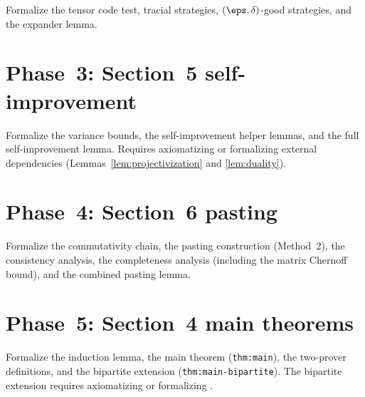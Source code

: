 Formalize the tensor code test, tracial strategies,
$(\eps,\delta)$-good strategies, and the expander lemma.

\section{Phase~3: Section~5 self-improvement}

Formalize the variance bounds, the self-improvement helper lemmas,
and the full self-improvement lemma.
Requires axiomatizing or formalizing external dependencies
(Lemmas~\ref{lem:projectivization} and \ref{lem:duality}).

\section{Phase~4: Section~6 pasting}

Formalize the commutativity chain, the pasting construction (Method~2),
the consistency analysis, the completeness analysis
(including the matrix Chernoff bound), and the combined pasting lemma.

\section{Phase~5: Section~4 main theorems}

Formalize the induction lemma, the main theorem (\texttt{thm:main}),
the two-prover definitions, and the bipartite extension
(\texttt{thm:main-bipartite}).
The bipartite extension requires axiomatizing or formalizing
\cite[Corollary~4.1]{vidick2021almost}.